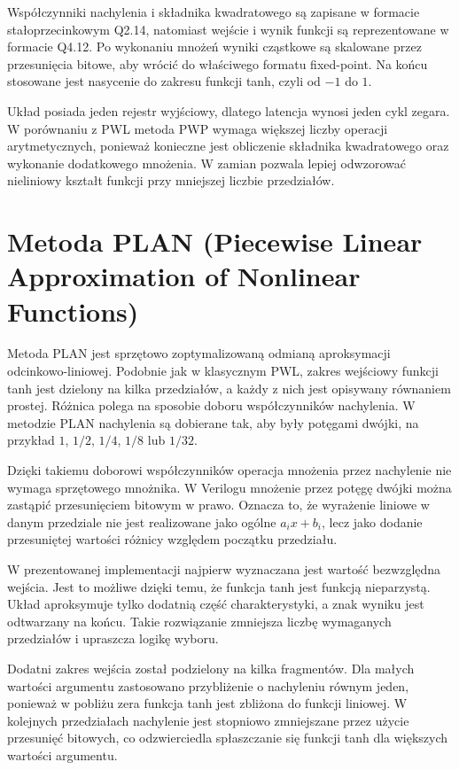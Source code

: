 \documentclass[12pt, a4paper, oneside]{scrreprt}
\begin{document}
Współczynniki nachylenia i składnika kwadratowego są zapisane w formacie stałoprzecinkowym
Q2.14, natomiast wejście i wynik funkcji są reprezentowane w formacie Q4.12.
Po wykonaniu mnożeń wyniki cząstkowe są skalowane przez przesunięcia bitowe,
aby wrócić do właściwego formatu fixed-point. Na końcu stosowane jest nasycenie
do zakresu funkcji tanh, czyli od $-1$ do $1$.

Układ posiada jeden rejestr wyjściowy, dlatego latencja wynosi jeden cykl zegara.
W porównaniu z PWL metoda PWP wymaga większej liczby operacji arytmetycznych,
ponieważ konieczne jest obliczenie składnika kwadratowego oraz wykonanie dodatkowego
mnożenia. W zamian pozwala lepiej odwzorować nieliniowy kształt funkcji przy mniejszej
liczbie przedziałów.


\section{Metoda PLAN (Piecewise Linear Approximation of Nonlinear Functions)}

Metoda PLAN jest sprzętowo zoptymalizowaną odmianą aproksymacji odcinkowo-liniowej.
Podobnie jak w klasycznym PWL, zakres wejściowy funkcji tanh jest dzielony na kilka
przedziałów, a każdy z nich jest opisywany równaniem prostej. Różnica polega na sposobie
doboru współczynników nachylenia. W metodzie PLAN nachylenia są dobierane tak,
aby były potęgami dwójki, na przykład $1$, $1/2$, $1/4$, $1/8$ lub $1/32$.

Dzięki takiemu doborowi współczynników operacja mnożenia przez nachylenie nie wymaga
sprzętowego mnożnika. W Verilogu mnożenie przez potęgę dwójki można zastąpić przesunięciem
bitowym w prawo. Oznacza to, że wyrażenie liniowe w danym przedziale nie jest realizowane
jako ogólne $a_i x + b_i$, lecz jako dodanie przesuniętej wartości różnicy względem początku
przedziału.

W prezentowanej implementacji najpierw wyznaczana jest wartość bezwzględna wejścia.
Jest to możliwe dzięki temu, że funkcja tanh jest funkcją nieparzystą. Układ aproksymuje
tylko dodatnią część charakterystyki, a znak wyniku jest odtwarzany na końcu.
Takie rozwiązanie zmniejsza liczbę wymaganych przedziałów i upraszcza logikę wyboru.

Dodatni zakres wejścia został podzielony na kilka fragmentów. Dla małych wartości argumentu
zastosowano przybliżenie o nachyleniu równym jeden, ponieważ w pobliżu zera funkcja tanh
jest zbliżona do funkcji liniowej. W kolejnych przedziałach nachylenie jest stopniowo
zmniejszane przez użycie przesunięć bitowych, co odzwierciedla spłaszczanie się funkcji
tanh dla większych wartości argumentu.
\end{document}
